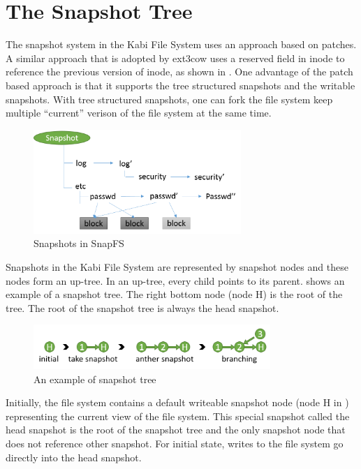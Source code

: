 \section{The Snapshot Tree}

    The snapshot system in the Kabi File System uses an approach based on patches. A similar approach that is adopted by ext3cow uses a reserved field in inode to reference the previous version of inode, as shown in . One advantage of the patch based approach is that it supports the tree structured snapshots and the writable snapshots. With tree structured snapshots, one can fork the file system keep multiple ``current'' verison of the file system at the same time.

\begin{figure}[t]
\centering
\includegraphics[width=0.7\textwidth]{Chapter-4/figs/fig24.png}
\caption{Snapshots in SnapFS}
\label{fig:snapfs_approach}
\end{figure}

    Snapshots in the Kabi File System are represented by snapshot nodes and these nodes form an up-tree. In an up-tree, every child points to its parent.  shows an example of a snapshot tree. The right bottom node (node H) is the root of the tree. The root of the snapshot tree is always the head snapshot.

\begin{figure}[t]
\centering
\includegraphics[width=0.8\textwidth]{Chapter-4/figs/fig13.png}
\caption{An example of snapshot tree}
\label{fig:snap_tree_example}
\end{figure}

    Initially, the file system contains a default writeable snapshot node (node H in ) representing the current view of the file system. This special snapshot called the head snapshot is the root of the snapshot tree and the only snapshot node that does not reference other snapshot. For initial state,  writes to the file system go directly into the head snapshot.
    
